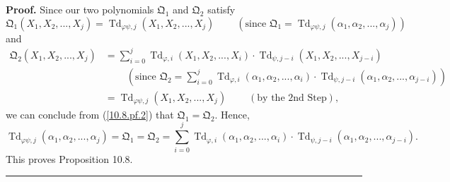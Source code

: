 \documentclass[numbers=enddot,12pt,final,onecolumn,notitlepage]{scrartcl}%
\newenvironment{proof}[1][Proof]{\noindent\textbf{#1.} }{\ \rule{0.5em}{0.5em}}
\begin{document}
\begin{proof}
Since our two polynomials $\mathfrak{Q}_{1}$ and $\mathfrak{Q}_{2}$ satisfy%
\[
\mathfrak{Q}_{1}\left(  X_{1},X_{2},...,X_{j}\right)  =\operatorname*{Td}%
\nolimits_{\varphi\psi,j}\left(  X_{1},X_{2},...,X_{j}\right)
\ \ \ \ \ \ \ \ \ \ \left(  \text{since }\mathfrak{Q}_{1}=\operatorname*{Td}%
\nolimits_{\varphi\psi,j}\left(  \alpha_{1},\alpha_{2},...,\alpha_{j}\right)
\right)
\]
and%
\begin{align*}
\mathfrak{Q}_{2}\left(  X_{1},X_{2},...,X_{j}\right)   &  =\sum_{i=0}%
^{j}\operatorname*{Td}\nolimits_{\varphi,i}\left(  X_{1},X_{2},...,X_{i}%
\right)  \cdot\operatorname*{Td}\nolimits_{\psi,j-i}\left(  X_{1}%
,X_{2},...,X_{j-i}\right) \\
&  \ \ \ \ \ \ \ \ \ \ \left(  \text{since }\mathfrak{Q}_{2}=\sum
\limits_{i=0}^{j}\operatorname*{Td}\nolimits_{\varphi,i}\left(  \alpha
_{1},\alpha_{2},...,\alpha_{i}\right)  \cdot\operatorname*{Td}\nolimits_{\psi
,j-i}\left(  \alpha_{1},\alpha_{2},...,\alpha_{j-i}\right)  \right) \\
&  =\operatorname*{Td}\nolimits_{\varphi\psi,j}\left(  X_{1},X_{2}%
,...,X_{j}\right)  \ \ \ \ \ \ \ \ \ \ \left(  \text{by the 2nd Step}\right)
,
\end{align*}
we can conclude from (\ref{10.8.pf.2}) that $\mathfrak{Q}_{1}=\mathfrak{Q}%
_{2}$. Hence,%
\[
\operatorname*{Td}\nolimits_{\varphi\psi,j}\left(  \alpha_{1},\alpha
_{2},...,\alpha_{j}\right)  =\mathfrak{Q}_{1}=\mathfrak{Q}_{2}=\sum
\limits_{i=0}^{j}\operatorname*{Td}\nolimits_{\varphi,i}\left(  \alpha
_{1},\alpha_{2},...,\alpha_{i}\right)  \cdot\operatorname*{Td}\nolimits_{\psi
,j-i}\left(  \alpha_{1},\alpha_{2},...,\alpha_{j-i}\right)  .
\]
This proves Proposition 10.8.
\end{proof}
\end{document}
